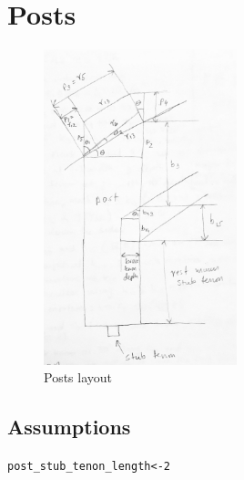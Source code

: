 \documentclass{article}\usepackage[]{graphicx}\usepackage[]{xcolor}
\makeatletter
\newcommand{\hlnum}[1]{\textcolor[rgb]{0.686,0.059,0.569}{#1}}%
\newcommand{\hlstd}[1]{\textcolor[rgb]{0.345,0.345,0.345}{#1}}%
\newcommand{\hlkwb}[1]{\textcolor[rgb]{0.69,0.353,0.396}{#1}}%
\newenvironment{kframe}{%
 \def\at@end@of@kframe{}%
 \ifinner\ifhmode%
  \def\at@end@of@kframe{\end{minipage}}%
  \begin{minipage}{\columnwidth}%
 \fi\fi%
 \def\FrameCommand##1{\hskip\@totalleftmargin \hskip-\fboxsep
 \colorbox{shadecolor}{##1}\hskip-\fboxsep
     \hskip-\linewidth \hskip-\@totalleftmargin \hskip\columnwidth}%
 \MakeFramed {\advance\hsize-\width
   \@totalleftmargin\z@ \linewidth\hsize
   \@setminipage}}%
 {\par\unskip\endMakeFramed%
 \at@end@of@kframe}
\newenvironment{knitrout}{}{} %
\makeatother
\begin{document}










\section{Posts}\label{posts-plan}
\begin{figure}
  \begin{center}
  	\includegraphics[width=0.5\textwidth]{images/post_calculations}
  \end{center}
	\caption{Posts layout}
\end{figure}

\subsection{Assumptions} \label{posts-plan-assumptions}
\begin{knitrout}
\color{fgcolor}\begin{kframe}
\begin{alltt}
\hlstd{post_stub_tenon_length} \hlkwb{<-} \hlnum{2}
\end{alltt}
\end{kframe}
\end{knitrout}
\end{document}
